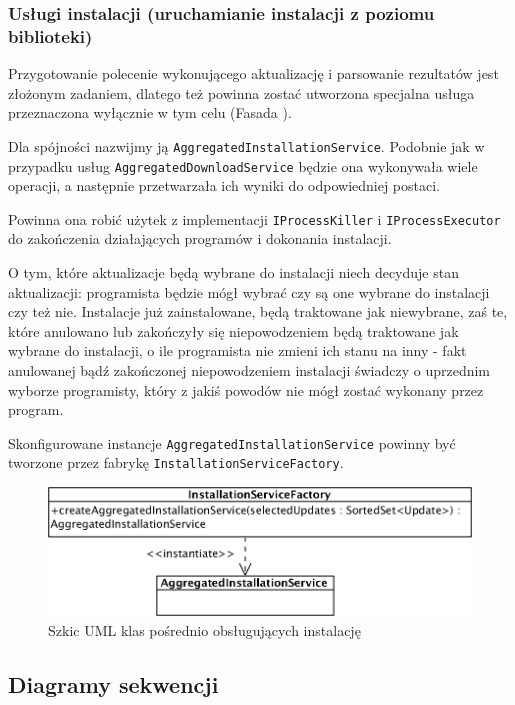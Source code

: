 \documentclass[polish,12pt,titlepage]{article}
\begin{document}
\subsubsection{Usługi instalacji (uruchamianie instalacji z poziomu biblioteki)}

Przygotowanie polecenie wykonującego aktualizację i parsowanie rezultatów jest
złożonym zadaniem, dlatego też powinna zostać utworzona specjalna usługa
przeznaczona wyłącznie w tym celu (Fasada \cite{FASADA}).

Dla spójności nazwijmy ją \texttt{AggregatedInstallationService}. Podobnie jak
w przypadku usług \texttt{AggregatedDownloadService} będzie ona wykonywała
wiele operacji, a następnie przetwarzała ich wyniki do odpowiedniej postaci.

Powinna ona robić użytek z implementacji \texttt{IProcessKiller} i
\texttt{IProcessExecutor} do zakończenia działających programów i dokonania
instalacji.

O tym, które aktualizacje będą wybrane do instalacji niech decyduje stan
aktualizacji: programista będzie mógł wybrać czy są one wybrane do instalacji
czy też nie. Instalacje już zainstalowane, będą traktowane jak niewybrane,
zaś te, które anulowano lub zakończyły się niepowodzeniem będą traktowane jak
wybrane do instalacji, o ile programista nie zmieni ich stanu na inny - fakt
anulowanej bądź zakończonej niepowodzeniem instalacji świadczy o uprzednim
wyborze programisty, który z jakiś powodów nie mógł zostać wykonany przez
program.

Skonfigurowane instancje \texttt{AggregatedInstallationService} powinny być
tworzone przez fabrykę \texttt{InstallationServiceFactory}.

\begin{figure}[!ht]
\centering
\includegraphics[bb=0 0 863 263, scale=0.50]{Installation.png}
\caption{Szkic UML klas pośrednio obsługujących instalację}
\end{figure}


\subsection{Diagramy sekwencji}
\end{document}
